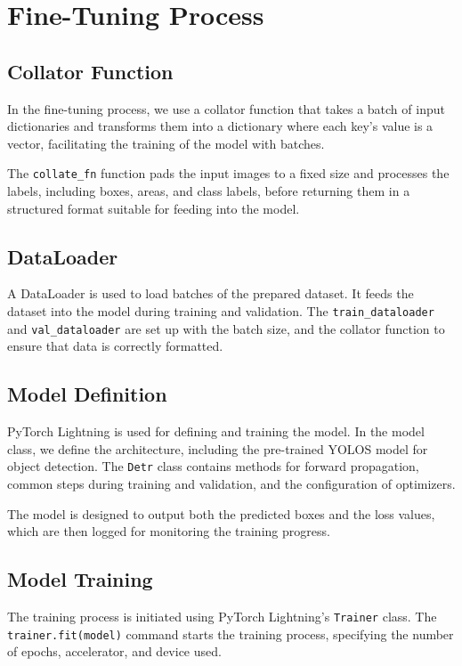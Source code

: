 \section{Fine-Tuning Process}

\subsection*{Collator Function}
In the fine-tuning process, we use a collator function that takes a batch of input dictionaries and transforms them into a dictionary where each key's value is a vector, facilitating the training of the model with batches.

\vspace{-1.25em}
The \texttt{collate\_fn} function pads the input images to a fixed size and processes the labels, including boxes, areas, and class labels, before returning them in a structured format suitable for feeding into the model.

\vspace{-1.25em}
\subsection*{DataLoader}
A DataLoader is used to load batches of the prepared dataset. It feeds the dataset into the model during training and validation. The \texttt{train\_dataloader} and \texttt{val\_dataloader} are set up with the batch size, and the collator function to ensure that data is correctly formatted.

\vspace{-1.25em}
\subsection*{Model Definition}
PyTorch Lightning is used for defining and training the model. In the model class, we define the architecture, including the pre-trained YOLOS model for object detection. The \texttt{Detr} class contains methods for forward propagation, common steps during training and validation, and the configuration of optimizers.

\vspace{-1.25em}
The model is designed to output both the predicted boxes and the loss values, which are then logged for monitoring the training progress.

\vspace{-1.25em}
\subsection*{Model Training}
The training process is initiated using PyTorch Lightning’s \texttt{Trainer} class. The \texttt{trainer.fit(model)} command starts the training process, specifying the number of epochs, accelerator, and device used.

